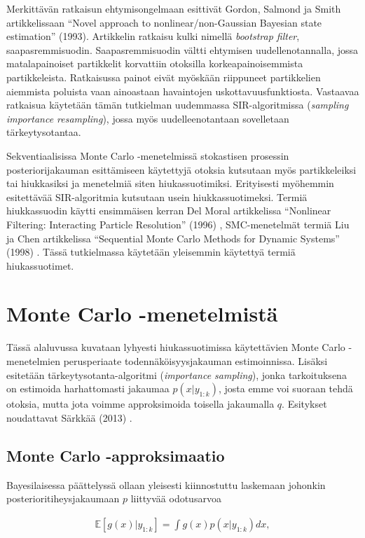 \documentclass[
  12pt,
  a4paper, twoside]{book}
\begin{document}
Merkittävän ratkaisun ehtymisongelmaan esittivät Gordon, Salmond ja Smith artikkelissaan ``Novel approach to nonlinear/non-Gaussian Bayesian state estimation'' (1993). \citep{Gordon-1993} Artikkelin ratkaisu kulki nimellä \emph{bootstrap filter}, saapasremmisuodin. Saapasremmisuodin vältti ehtymisen uudellenotannalla, jossa matalapainoiset partikkelit korvattiin otoksilla korkeapainoisemmista partikkeleista. Ratkaisussa painot eivät myöskään riippuneet partikkelien aiemmista poluista vaan ainoastaan havaintojen uskottavuusfunktiosta. Vastaavaa ratkaisua käytetään tämän tutkielman uudemmassa SIR-algoritmissa (\emph{sampling importance resampling}), jossa myös uudelleenotantaan sovelletaan tärkeytysotantaa.

Sekventiaalisissa Monte Carlo -menetelmissä stokastisen prosessin posteriorijakauman esittämiseen käytettyjä otoksia kutsutaan myös partikkeleiksi tai hiukkasiksi ja menetelmiä siten hiukassuotimiksi. Erityisesti myöhemmin esitettävää SIR-algoritmia kutsutaan usein hiukkassuotimeksi. Termiä hiukkassuodin käytti ensimmäisen kerran Del Moral artikkelissa ``Nonlinear Filtering: Interacting Particle Resolution'' (1996) \citep{DelMoral-1996}, SMC-menetelmät termiä Liu ja Chen artikkelissa ``Sequential Monte Carlo Methods for Dynamic Systems'' (1998) \citep{Liu-1998}. Tässä tutkielmassa käytetään yleisemmin käytettyä termiä hiukassuotimet.

\section{Monte Carlo -menetelmistä}

Tässä alaluvussa kuvataan lyhyesti hiukassuotimissa käytettävien Monte Carlo -menetelmien perusperiaate todennäköisyysjakauman estimoinnissa. Lisäksi esitetään tärkeytysotanta-algoritmi (\emph{importance sampling}), jonka tarkoituksena on estimoida harhattomasti jakaumaa \(p(x|y_{1:k})\), josta emme voi suoraan tehdä otoksia, mutta jota voimme approksimoida toisella jakaumalla \(q\). Esitykset noudattavat Särkkää (2013) \citep{sarkka-2013}.

\subsection{Monte Carlo -approksimaatio}

Bayesilaisessa päättelyssä ollaan yleisesti kiinnostuttu laskemaan johonkin posterioritiheysjakaumaan \(p\) liittyvää odotusarvoa

\begin{align}
\mathbb{E}[g(x)|y_{1:k}]=\int g(x)p(x|y_{1:k})dx,
\end{align}
\end{document}

